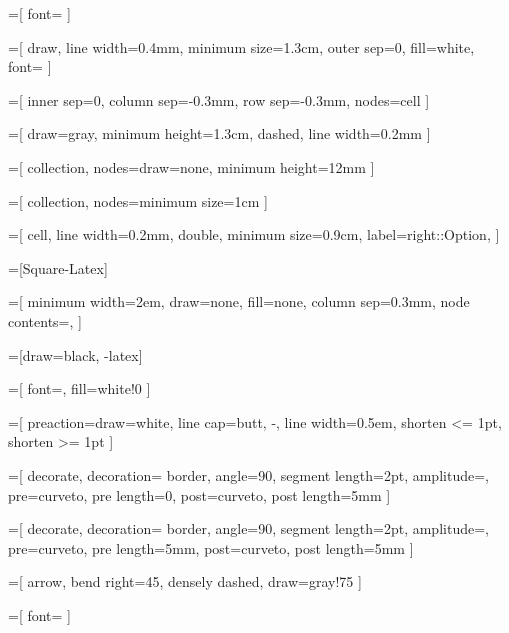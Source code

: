 \newcommand{\true}{\textcolor{green}{\ding{51}}}
\newcommand{\false}{\textcolor{red}{\ding{55}}}

=[
  font=\large
]

=[
  draw,
  line width=0.4mm,
  minimum size=1.3cm,
  outer sep=0,
  fill=white,
  font=\large
]

=[
  inner sep=0,
  column sep=-0.3mm,
  row sep=-0.3mm,
  nodes=cell
]

=[
  draw=gray,
  minimum height=1.3cm,
  dashed,
  line width=0.2mm
]

=[
  collection,
  nodes={draw=none, minimum height=12mm}
]

=[
  collection,
  nodes={minimum size=1cm }
]

=[
  cell,
  line width=0.2mm,
  double,
  minimum size=0.9cm,
  label={right::Option},
]

=[Square-Latex]


\newcommand{\ellipsis}[1][15mm]{ \node [ellipsis=#1]; }

=[
  minimum width=2em,
  draw=none,
  fill=none,
  column sep=0.3mm,
  node contents={,}
]

\newcommand{\tuplecomma}{ \node [tuple comma]; }

=[draw=black, -latex]

=[
  font=\small,
  fill=white!0
]

=[
  preaction={draw=white, line cap=butt, -, line width=0.5em},
  shorten <= 1pt,
  shorten >= 1pt
]

=[
  decorate,
  decoration={
    border, angle=90, segment length=2pt, amplitude=\pgflinewidth,
    pre=curveto, pre length=0, post=curveto, post length=5mm
  }
]

=[
  decorate,
  decoration={
    border, angle=90, segment length=2pt, amplitude=\pgflinewidth,
    pre=curveto, pre length=5mm, post=curveto, post length=5mm
  }
]

=[
  arrow,
  bend right=45,
  densely dashed,
  draw=gray!75
]

=[
  font=\small
]

